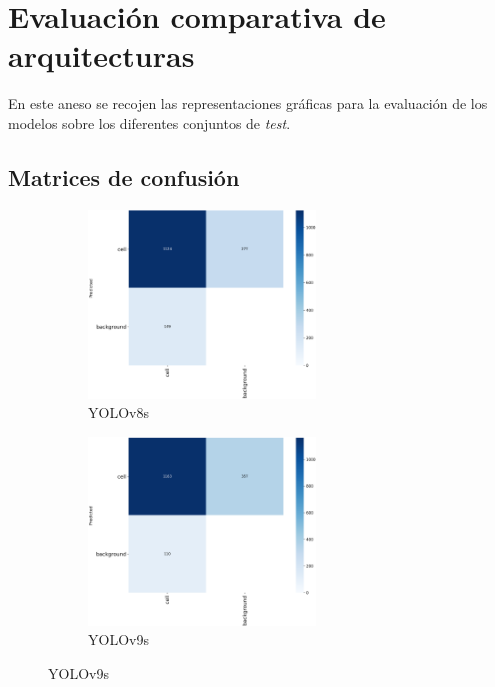 \documentclass[12pt,a4paper,onecolumn,oneside]{report}
\begin{document}
\chapter{Evaluación comparativa de arquitecturas} %
\label{Evaluación comparativa de arquitecturas}

En este aneso se recojen las representaciones gráficas para la evaluación de los modelos sobre los diferentes conjuntos de \textit{test}. 

\section{Matrices de confusión}
\label{sec:Matrice de confusión}

\begin{figure}[H]
  \centering
  \vspace{-0.3cm}
  \begin{subfigure}[b]{0.45\textwidth}
    \centering
    \includegraphics[height=5cm]{figuras/resultados experimentacion/yolov8s/original_test/confusion_matrix.png}
    \vspace{-0.3cm}
    \caption{\footnotesize YOLOv8s}
    \label{fig:confusion_yolov8s_original_test}
  \end{subfigure}
  \hfill
  \begin{subfigure}[b]{0.45\textwidth}
    \centering
    \includegraphics[height=5cm]{figuras/resultados experimentacion/yolov9s/original_test/confusion_matrix.png}
    \vspace{-0.3cm}
    \caption{\footnotesize YOLOv9s}
    \label{fig:confusion_yolov9s_original_test}
  \end{subfigure}
  

\end{figure}
\end{document}
